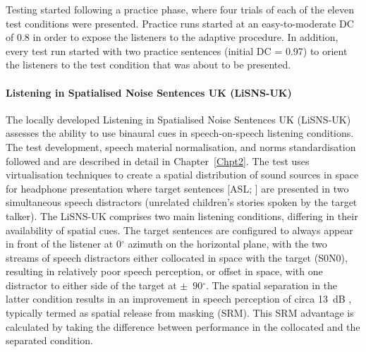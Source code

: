 \documentclass[a4paper, twoside]{templates/ociamthesis}
\begin{document}
Testing started following a practice phase, where four trials of each of the eleven test conditions were presented. Practice runs started at an easy-to-moderate DC of 0.8 in order to expose the listeners to the adaptive procedure. In addition, every test run started with two practice sentences (initial DC = 0.97) to orient the listeners to the test condition that was about to be presented.\\

\hypertarget{listening-in-spatialised-noise-sentences-uk-lisns-uk}{%
\paragraph{Listening in Spatialised Noise Sentences UK (LiSNS-UK)}\label{listening-in-spatialised-noise-sentences-uk-lisns-uk}}

\hfill\break
The locally developed Listening in Spatialised Noise Sentences UK (LiSNS-UK) assesses the ability to use binaural cues in speech-on-speech listening conditions. The test development, speech material normalisation, and norms standardisation followed \textcite{Cameron2007} and are described in detail in Chapter~\ref{Chpt2}. The test uses virtualisation techniques to create a spatial distribution of sound sources in space for headphone presentation where target sentences {[}ASL; \textcite{MacLeod1990}{]} are presented in two simultaneous speech distractors (unrelated children's stories spoken by the target talker). The LiSNS-UK comprises two main listening conditions, differing in their availability of spatial cues. The target sentences are configured to always appear in front of the listener at 0\(^{\circ}\) azimuth on the horizontal plane, with the two streams of speech distractors either collocated in space with the target (S0N0), resulting in relatively poor speech perception, or offset in space, with one distractor to either side of the target at \(\pm\)~90\(^{\circ}\). The spatial separation in the latter condition results in an improvement in speech perception of circa 13~dB \autocite{Cameron2011}, typically termed as spatial release from masking (SRM). This SRM advantage is calculated by taking the difference between performance in the collocated and the separated condition.\\
\end{document}
